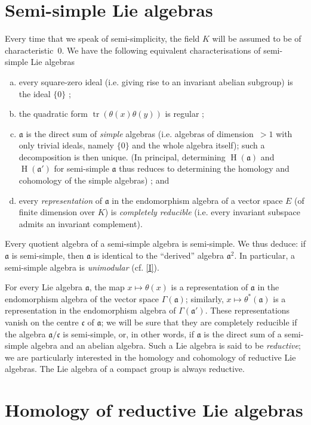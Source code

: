 \documentclass{article}
\newcommand{\fk}{\mathfrak}
\DeclareMathOperator{\HH}{H}
\DeclareMathOperator{\tr}{tr}
\newcommand{\oldpage}[1]{\marginpar{\footnotesize$\Big\vert$ \textit{p.~#1}}}
\begin{document}
\section{Semi-simple Lie algebras}
\label{II.3}

Every time that we speak of semi-simplicity, the field $K$ will be assumed to be of characteristic~$0$.
We have the following equivalent characterisations of semi-simple Lie algebras
\begin{enumerate}[(a)]
  \item every square-zero ideal (i.e. giving rise to an invariant abelian subgroup) is the ideal $\{0\}$ ;
  \item the quadratic form $\tr(\theta(x)\theta(y))$ is regular ;
  \item $\fk{a}$ is the direct sum of \emph{simple} algebras (i.e. algebras of dimension~$>1$ with only trivial ideals, namely $\{0\}$ and the whole algebra itself);
    such a decomposition is then unique.
    (In principal, determining $\HH(\fk{a})$ and $\HH(\fk{a}')$ for semi-simple $\fk{a}$ thus reduces to determining the homology and cohomology of the simple algebras) ; and
\oldpage{47}
  \item every \emph{representation} of $\fk{a}$ in the endomorphism algebra of a vector space $E$ (of finite dimension over $K$) is \emph{completely reducible} (i.e. every invariant subspace admits an invariant complement).
\end{enumerate}

Every quotient algebra of a semi-simple algebra is semi-simple.
We thus deduce:
if $\fk{a}$ is semi-simple, then $\fk{a}$ is identical to the ``derived'' algebra $\fk{a}^2$.
In particular, a semi-simple algebra is \emph{unimodular} (cf. \cref{I}).

For every Lie algebra $\fk{a}$, the map $x\mapsto\theta(x)$ is a representation of $\fk{a}$ in the endomorphism algebra of the vector space $\Gamma(\fk{a})$;
similarly, $x\mapsto\theta^*(\fk{a})$ is a representation in the endomorphism algebra of $\Gamma(\fk{a}')$.
These representations vanish on the centre $\fk{c}$ of $\fk{a}$;
we will be sure that they are completely reducible if the algebra $\fk{a}/\fk{c}$ is semi-simple, or, in other words, if $\fk{a}$ is the direct sum of a semi-simple algebra and an abelian algebra.
Such a Lie algebra is said to be \emph{reductive};
we are particularly interested in the homology and cohomology of reductive Lie algebras.
The Lie algebra of a compact group is always reductive.


\section{Homology of reductive Lie algebras}
\label{II.4}
\end{document}
